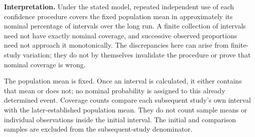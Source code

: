 \textbf{Interpretation.} Under the stated model, repeated independent use of each confidence procedure covers the fixed population mean in approximately its nominal percentage of intervals over the long run. A finite collection of intervals need not have exactly nominal coverage, and successive observed proportions need not approach it monotonically. The discrepancies here can arise from finite-study variation; they do not by themselves invalidate the procedure or prove that nominal coverage is wrong.

The population mean is fixed. Once an interval is calculated, it either contains that mean or does not; no nominal probability is assigned to this already determined event. Coverage counts compare each subsequent study's own interval with the later-established population mean. They do not count sample means or individual observations inside the initial interval. The initial and comparison samples are excluded from the subsequent-study denominator.

\secInicio[][sec:p3]

\clearpage

